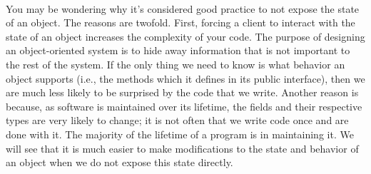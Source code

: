 \documentclass{article}
\begin{document}
\paragraph{}
You may be wondering why it’s considered good practice to not expose the state of an object. The reasons are twofold. First, forcing a client to interact with the state of an object increases the complexity of your code. The purpose of designing an object-oriented system is to hide away information that is not important to the rest of the system. If the only thing we need to know is what behavior an object supports (i.e., the methods which it defines in its public interface), then we are much less likely to be surprised by the code that we write. Another reason is because, as software is maintained over its lifetime, the fields and their respective types are very likely to change; it is not often that we write code once and are done with it. The majority of the lifetime of a program is in maintaining it. We will see that it is much easier to make modifications to the state and behavior of an object when we do not expose this state directly. 
\end{document}
